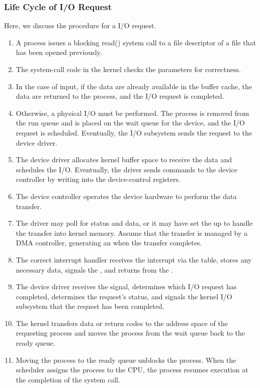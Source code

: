 \subsubsection{Life Cycle of I/O Request}\label{subsubsec:IO_Request_Life_Cycle}
Here, we discuss the procedure for a  I/O request.
\begin{enumerate}[noitemsep]
\item A process issues a blocking read() system call to a file descriptor of a file that has been opened previously.
\item The system-call code in the kernel checks the parameters for correctness.
\item In the case of input, if the data are already available in the buffer cache, the data are returned to the process, and the I/O request is completed.
\item Otherwise, a physical I/O must be performed.
  The process is removed from the run queue and is placed on the wait queue for the device, and the I/O request is scheduled.
  Eventually, the I/O subsystem sends the request to the device driver.
\item The device driver allocates kernel buffer space to receive the data and schedules the I/O.
  Eventually, the driver sends commands to the device controller by writing into the device-control registers.
\item The device controller operates the device hardware to perform the data transfer.
\item The driver may poll for status and data, or it may have set the  up to handle the transfer into kernel memory.
  Assume that the transfer is managed by a DMA controller, generating an  when the transfer completes.
\item The correct interrupt handler receives the interrupt via the  table, stores any necessary data, signals the , and returns from the .
\item The device driver receives the signal, determines which I/O request has completed, determines the request’s status, and signals the kernel I/O subsystem that the request has been completed.
\item The kernel transfers data or return codes to the address space of the requesting process and moves the process from the wait queue back to the ready queue.
\item Moving the process to the ready queue unblocks the process.
  When the scheduler assigns the process to the CPU, the process resumes execution at the completion of the system call.
\end{enumerate}

